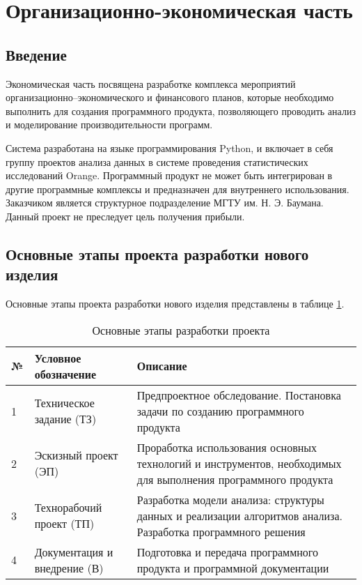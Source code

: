 \section{Организационно-экономическая часть}
\subsection{Введение}
Экономическая часть посвящена разработке комплекса мероприятий организационно–экономического и финансового планов, которые необходимо выполнить для создания программного продукта, позволяющего проводить анализ и моделирование производительности программ.

Система разработана на языке программирования Python, и включает в себя группу проектов анализа данных в системе проведения статистических исследований Orange. Программный продукт не может быть интегрирован в другие программные комплексы и предназначен для внутреннего использования. Заказчиком является структурное подразделение МГТУ им. Н. Э. Баумана.
Данный проект не преследует цель получения прибыли.

\subsection{Основные этапы проекта разработки нового изделия}
Основные этапы проекта разработки нового изделия представлены в таблице \ref{tab:development-stages}.

\begin{table}[H]
    \caption{\label{tab:development-stages}Основные этапы разработки проекта}
    \begin{tabular}[H]{|l|p{5cm}|p{8cm}|}
        \hline
        № & Условное обозначение & Описание\\
        \hline
        1 & Техническое задание (ТЗ) & Предпроектное обследование. Постановка задачи по созданию программного продукта\\
        \hline
        2 & Эскизный проект (ЭП) & Проработка использования основных технологий и инструментов, необходимых для выполнения программного продукта\\
        \hline
        3 & Технорабочий проект (ТП) & Разработка модели анализа: структуры данных и реализации алгоритмов анализа. Разработка программного решения\\
        \hline
        4 & Документация и внедрение (В) & Подготовка и передача программного продукта и программной документации\\
        \hline
    \end{tabular}
\end{table}

